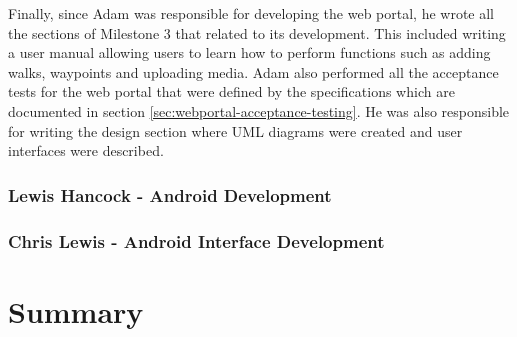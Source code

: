 \documentclass[11pt,a4paper]{report}
\begin{document}
Finally, since Adam was responsible for developing the web portal, he wrote all the sections of Milestone 3 that related to its development. This included writing a user manual allowing users to learn how to perform functions such as adding walks, waypoints and uploading media. Adam also performed all the acceptance tests for the web portal that were defined by the specifications which are documented in section \ref{sec:webportal-acceptance-testing}. He was also responsible for writing the design section where UML diagrams were created and user interfaces were described.

\subsection{Lewis Hancock - Android Development}
\subsection{Chris Lewis - Android Interface Development}

\chapter*{Summary}
\label{sec:summary}

\newpage



\appendix
\end{document}
